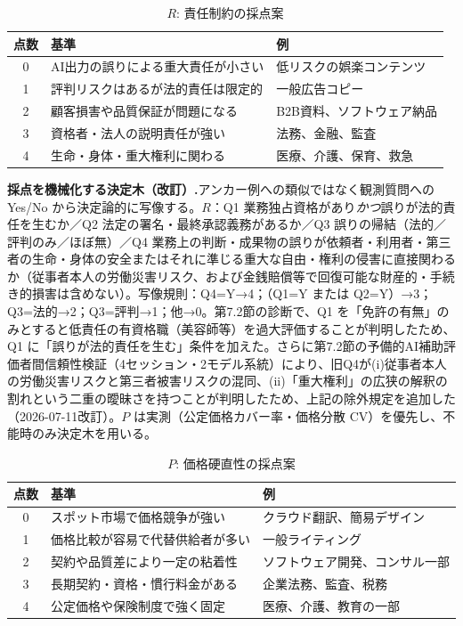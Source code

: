 \documentclass[11pt]{article}
\theoremstyle{plain}
\theoremstyle{definition}
\theoremstyle{remark}
\begin{document}
\begin{table}[h]\centering\small
\caption{$R$: 責任制約の採点案}\label{tab:cbR}
\begin{tabularx}{\textwidth}{@{}clX@{}}\toprule
点数 & 基準 & 例 \\ \midrule
0 & AI出力の誤りによる重大責任が小さい & 低リスクの娯楽コンテンツ \\
1 & 評判リスクはあるが法的責任は限定的 & 一般広告コピー \\
2 & 顧客損害や品質保証が問題になる & B2B資料、ソフトウェア納品 \\
3 & 資格者・法人の説明責任が強い & 法務、金融、監査 \\
4 & 生命・身体・重大権利に関わる & 医療、介護、保育、救急 \\
\bottomrule\end{tabularx}
\end{table}

\noindent\textbf{採点を機械化する決定木（改訂）.}\quad アンカー例への類似ではなく観測質問への Yes/No から決定論的に写像する。$R$：Q1 業務独占資格があり\emph{かつ}誤りが法的責任を生むか／Q2 法定の署名・最終承認義務があるか／Q3 誤りの帰結（法的／評判のみ／ほぼ無）／Q4 業務上の判断・成果物の誤りが依頼者・利用者・第三者の生命・身体の安全またはそれに準じる重大な自由・権利の侵害に直接関わるか（従事者本人の労働災害リスク、および金銭賠償等で回復可能な財産的・手続き的損害は含めない）。写像規則：Q4=Y→4；（Q1=Y または Q2=Y）→3；Q3=法的→2；Q3=評判→1；他→0。第7.2節の診断で、Q1 を「免許の有無」のみとすると低責任の有資格職（美容師等）を過大評価することが判明したため、Q1 に「誤りが法的責任を生む」条件を加えた。さらに第7.2節の予備的AI補助評価者間信頼性検証（4セッション・2モデル系統）により、旧Q4が(i)従事者本人の労働災害リスクと第三者被害リスクの混同、(ii)「重大権利」の広狭の解釈の割れという二重の曖昧さを持つことが判明したため、上記の除外規定を追加した（2026-07-11改訂）。$P$ は実測（公定価格カバー率・価格分散 CV）を優先し、不能時のみ決定木を用いる。

\begin{table}[h]\centering\small
\caption{$P$: 価格硬直性の採点案}\label{tab:cbP}
\begin{tabularx}{\textwidth}{@{}clX@{}}\toprule
点数 & 基準 & 例 \\ \midrule
0 & スポット市場で価格競争が強い & クラウド翻訳、簡易デザイン \\
1 & 価格比較が容易で代替供給者が多い & 一般ライティング \\
2 & 契約や品質差により一定の粘着性 & ソフトウェア開発、コンサル一部 \\
3 & 長期契約・資格・慣行料金がある & 企業法務、監査、税務 \\
4 & 公定価格や保険制度で強く固定 & 医療、介護、教育の一部 \\
\bottomrule\end{tabularx}
\end{table}
\end{document}
